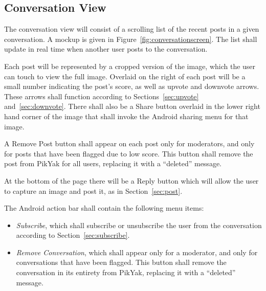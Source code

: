 \documentclass[11pt]{scrartcl}
\begin{document}
    \subsection{Conversation View}
    \label{sec:conversation}
        The conversation view will consist of a scrolling list of the recent posts in a given conversation.
        A mockup is given in Figure~\ref{fig:conversationscreen}.
        The list shall update in real time when another user posts to the conversation.

        Each post will be represented by a cropped version of the image, which the user can touch to view the full image.
        Overlaid on the right of each post will be a small number indicating the post's score, as well as upvote and downvote arrows.
        These arrows shall function according to Sections~\ref{sec:upvote} and~\ref{sec:downvote}.
        There shall also be a Share button overlaid in the lower right hand corner of the image that shall invoke the Android sharing menu for that image.

        A Remove Post button shall appear on each post only for moderators, and only for posts that have been flagged due to low score.  This button shall remove the post from PikYak for all users, replacing it with a ``deleted'' message.

        At the bottom of the page there will be a Reply button which will allow the user to capture an image and post it, as in Section~\ref{sec:post}.

        The Android action bar shall contain the following menu items:

        \begin{itemize}
            \item \emph{Subscribe}, which shall subscribe or unsubscribe the user from the conversation according to Section~\ref{sec:subscribe}.
            \item \emph{Remove Conversation}, which shall appear only for a moderator, and only for conversations that have been flagged.  This button shall remove the conversation in its entirety from PikYak, replacing it with a ``deleted'' message.
        \end{itemize}
\end{document}

